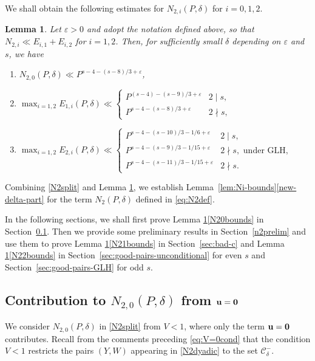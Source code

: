 \documentclass[letterpaper,11pt]{amsart}
\numberwithin{equation}{section}
\newtheorem{lemma}[theorem]{Lemma}
\theoremstyle{definition}
\numberwithin{equation}{section}
\newcommand{\uu}{\mathbf{u}}
\def\vecnull{{\text{\boldmath$0$}}}
\newcommand{\ve}{\varepsilon}
\begin{document}
We shall obtain the following estimates for $N_{2,i}(P, \delta)$ for $i=0,1,2$. 
\begin{lemma}\label{N2splitbounds}
    Let $\ve>0$ and adopt the notation defined above, so that 
$
N_{2,i}\ll E_{i,1}+E_{i,2}$ for $i=1,2$. Then, for sufficiently small $\delta$ depending on $\ve$ and $s$, we have
    \begin{enumerate}
        \item \label{N20bounds}
       $ N_{2,0}(P, \delta)\ll P^{s-4-(s-8)/3+\varepsilon}$,

    \item \label{N21bounds} $\max_{i=1,2}E_{1,i}(P, \delta)\ll\begin{cases}
      P^{(s-4)-(s-9)/3+\ve} & 2\mid s,\\
      P^{s-4-(s-8)/3+\ve} & 2\nmid s,
    \end{cases}$
    \item \label{N22bounds} $ \max_{i=1,2}E_{2,i}(P, \delta)\ll \begin{cases}
        P^{s-4-(s-10)/3-1/6+\ve} & 2\mid s,\\
        P^{s-4-(s-9)/3-1/15+\ve} & 2\nmid s, \text{ under GLH},\\
        P^{s-4-(s-11)/3-1/15+\ve} & 2\nmid s.
    \end{cases}$
    \end{enumerate}
\end{lemma}

Combining \eqref{N2split} and Lemma \ref{N2splitbounds}, we establish Lemma~\ref{lem:Ni-bounds}\eqref{new-delta-part} for the term $N_2(P, \delta)$ defined in \eqref{eq:N2def}.

In the following sections, we shall first prove Lemma \ref{N2splitbounds}\eqref{N20bounds} in Section~\ref{sec:V<1}. Then we provide some preliminary results in Section~\ref{n2prelim} and use them to prove Lemma \ref{N2splitbounds}\eqref{N21bounds} in Section~\ref{sec:bad-c} and Lemma \ref{N2splitbounds}\eqref{N22bounds} in Section~\ref{sec:good-pairs-unconditional} for even $s$ and Section~\ref{sec:good-pairs-GLH} for odd $s$. 



\subsection{Contribution to $N_{2,0}(P,\delta)$ from $\uu=\vecnull$}\label{sec:V<1}
We consider $N_{2,0}(P, \delta)$ in \eqref{N2split} from $V<1$, where only the term $\uu=\vecnull$ contributes.
Recall from the comments preceding \eqref{eq:V=0cond} that  
the condition $V<1$ restricts the pairs $(Y, W)$ appearing in \eqref{N2dyadic} to the set $\mathcal C_\delta^-$.
\end{document}
